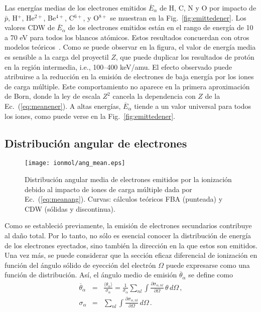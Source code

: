 Las energías medias de los electrones emitidos $\overline{E}_{\alpha}$ 
de H, C, N y O por impacto de $\bar{p}$, H$^{+}$, He$^{2+}$, Be$^{4+}$, 
C$^{6+}$, y O$^{8+}$ se muestran en la Fig.~\ref{fig:emittedener}. 
Los valores CDW de $\overline{E}_{\alpha}$ de los electrones emitidos 
están en el rango de energía de 10 a 70 eV para todos los blancos 
atómicos. Estos resultados concuerdan con otros modelos 
teóricos~\cite{Surdutovic:18}. Como se puede observar en la figura, el 
valor de energía media es sensible a la carga del proyectil $Z$, que 
puede duplicar los resultados de protón en la región intermedia, i.e., 
100--400 keV/amu. El efecto observado puede atribuirse a la reducción en 
la emisión de electrones de baja energía por los iones de carga múltiple. 
Este comportamiento no aparece en la primera aproximación de 
Born, donde la ley de escala $Z^2$ cancela la dependencia con $Z$ de la 
Ec.~(\ref{eq:meanener}). A altas energías, $\overline{E}_{\alpha}$ 
tiende a un valor universal para todos los iones, como puede verse en la 
Fig.~\ref{fig:emittedener}.

\subsection{Distribución angular de electrones}
\label{subsec:meanang}

\begin{figure}
\centering
\texttt{[image: ionmol/ang\_mean.eps]}
\caption[Distribución angular media de electrones emitidos.]
{Distribución angular media de electrones emitidos por la ionización 
debido al impacto de iones de carga múltiple dada por 
Ec.~(\ref{eq:meanang}). Curvas: cálculos teóricos FBA (punteada) y CDW 
(sólidas y discontinua).}
\label{fig:emittedang}
\end{figure} 

Como se estableció previamente, la emisión de electrones secundarios 
contribuye al daño total. Por lo tanto, no sólo es esencial conocer la 
distribución de energía de los electrones eyectados, sino también la 
dirección en la que estos son emitidos. Una vez más, se puede considerar 
que la sección eficaz diferencial de ionización en función del ángulo 
sólido de eyección del electrón $\Omega$ puede expresarse como una 
función de distribución. Así, el ángulo medio de emisión 
$\overline{\theta}_{\alpha}$ se define como 
\begin{eqnarray}
\overline{\theta}_{\alpha}&=&\frac{\langle\theta_{\alpha}\rangle}
{\sigma_{\alpha}}=\frac{1}{\sigma_{\alpha}}\sum_{nl}
\int\frac{\partial\sigma_{\alpha,nl}}{\partial\Omega}\,\theta\,d\Omega\,,
\label{eq:meanang} \\
\sigma_{\alpha}&=&\sum_{nl}\int\frac{\partial\sigma_{\alpha,nl}}{
\partial\Omega}\,d\Omega\,.
\end{eqnarray}


